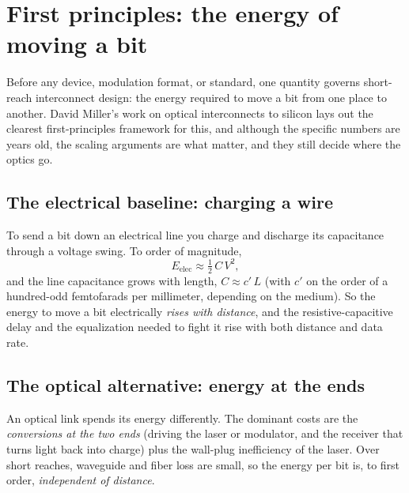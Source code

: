 \chapter{First principles: the energy of moving a bit}
\label{ch:firstprinciples}

Before any device, modulation format, or standard, one quantity governs
short-reach interconnect design: the energy required to move a bit from one place
to another. David Miller's work on optical interconnects to silicon lays out the
clearest first-principles framework for this, and although the specific numbers are years
old, the scaling arguments are what matter, and they still decide where the optics
go.

\section{The electrical baseline: charging a wire}

To send a bit down an electrical line you charge and discharge its capacitance
through a voltage swing. To order of magnitude,
\[
  E_{\text{elec}} \approx \tfrac{1}{2}\,C\,V^{2},
\]
and the line capacitance grows with length, $C \approx c'\,L$ (with $c'$ on the
order of a hundred-odd femtofarads per millimeter, depending on the medium).%
 So the energy to move a bit
electrically \emph{rises with distance}, and the resistive-capacitive delay and
the equalization needed to fight it rise with both distance and data rate.

\section{The optical alternative: energy at the ends}

An optical link spends its energy differently. The dominant costs are the
\emph{conversions at the two ends} (driving the laser or modulator, and the
receiver that turns light back into charge) plus the wall-plug inefficiency of
the laser. Over short reaches, waveguide and fiber loss are small, so the energy
per bit is, to first order, \emph{independent of distance}.

